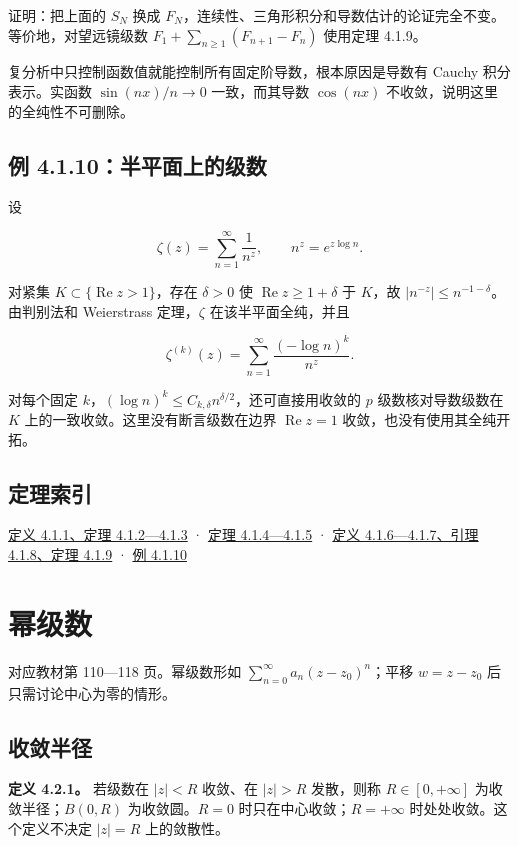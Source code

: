 \documentclass[11pt,a4paper]{article}
\begin{document}
证明：把上面的 \(S_N\) 换成
\(F_N\)，连续性、三角形积分和导数估计的论证完全不变。等价地，对望远镜级数
\(F_1+\sum_{n\ge1}(F_{n+1}-F_n)\) 使用定理 4.1.9。

复分析中只控制函数值就能控制所有固定阶导数，根本原因是导数有 Cauchy
积分表示。实函数 \(\sin(nx)/n\to0\) 一致，而其导数 \(\cos(nx)\)
不收敛，说明这里的全纯性不可删除。

\subsection{例 4.1.10：半平面上的级数}\label{ch04-s1-heading-4}

设

\[
\zeta(z)=\sum_{n=1}^{\infty}\frac1{n^z},\qquad n^z=e^{z\log n}.
\]

对紧集 \(K\subset\{\operatorname{Re}z>1\}\)，存在 \(\delta>0\) 使
\(\operatorname{Re}z\ge1+\delta\) 于 \(K\)，故
\(|n^{-z}|\le n^{-1-\delta}\)。由判别法和 Weierstrass 定理，\(\zeta\)
在该半平面全纯，并且

\[
\zeta^{(k)}(z)=\sum_{n=1}^{\infty}\frac{(-\log n)^k}{n^z}.
\]

对每个固定
\(k\)，\((\log n)^k\le C_{k,\delta}n^{\delta/2}\)，还可直接用收敛的
\(p\) 级数核对导数级数在 \(K\) 上的一致收敛。这里没有断言级数在边界
\(\operatorname{Re}z=1\) 收敛，也没有使用其全纯开拓。

\subsection{定理索引}\label{ch04-s1-heading-5}

\hyperref[ch04-s1-heading-1]{定义 4.1.1、定理 4.1.2---4.1.3} ·
\hyperref[ch04-s1-heading-2]{定理 4.1.4---4.1.5} · \hyperref[ch04-s1-heading-3]{定义
4.1.6---4.1.7、引理 4.1.8、定理 4.1.9} · \hyperref[ch04-s1-heading-4]{例 4.1.10}

\section{幂级数}
对应教材第 110---118 页。幂级数形如
\(\sum_{n=0}^{\infty}a_n(z-z_0)^n\)；平移 \(w=z-z_0\)
后只需讨论中心为零的情形。

\subsection{收敛半径}\label{ch04-s2-heading-1}

\textbf{定义 4.2.1。} 若级数在 \(|z|<R\) 收敛、在 \(|z|>R\) 发散，则称
\(R\in[0,+\infty]\) 为收敛半径；\(B(0,R)\) 为收敛圆。\(R=0\)
时只在中心收敛；\(R=+\infty\) 时处处收敛。这个定义不决定 \(|z|=R\)
上的敛散性。
\end{document}
